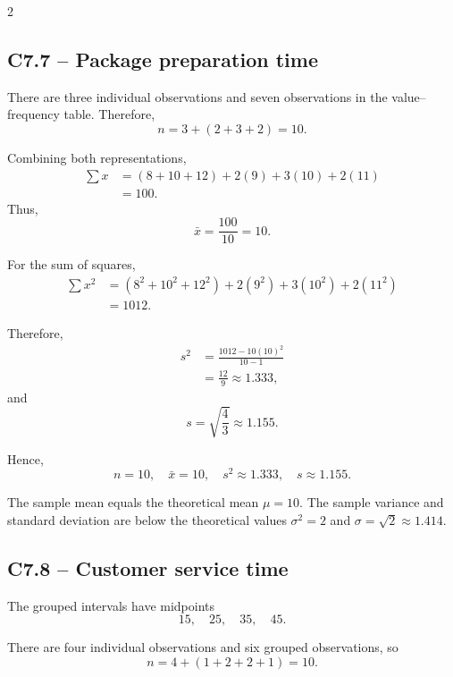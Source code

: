 \begin{multicols}{2}
		\subsection*{C7.7 -- Package preparation time}
		\label{subsec:c7-solution-package-preparation}
		
		There are three individual observations and seven observations in the
		value--frequency table. Therefore,
		\[
		n=3+(2+3+2)=10.
		\]
		
		Combining both representations,
		\[
		\begin{aligned}
			\sum x
			&=(8+10+12)+2(9)+3(10)+2(11)\\
			&=100.
		\end{aligned}
		\]
		Thus,
		\[
		\bar{x}=\frac{100}{10}=10.
		\]
		
		For the sum of squares,
		\[
		\begin{aligned}
			\sum x^2
			&=(8^2+10^2+12^2)
			+2(9^2)+3(10^2)+2(11^2)\\
			&=1012.
		\end{aligned}
		\]
		
		Therefore,
		\[
		\begin{aligned}
			s^2
			&=\frac{1012-10(10)^2}{10-1}\\
			&=\frac{12}{9}
			\approx1.333,
		\end{aligned}
		\]
		and
		\[
		s=\sqrt{\frac43}\approx1.155.
		\]
		
		Hence,
		\[
		\boxed{
			n=10,\quad
			\bar{x}=10,\quad
			s^2\approx1.333,\quad
			s\approx1.155.
		}
		\]
		
		The sample mean equals the theoretical mean $\mu=10$. The sample variance
		and standard deviation are below the theoretical values
		$\sigma^2=2$ and $\sigma=\sqrt2\approx1.414$.
		
		
		\subsection*{C7.8 -- Customer service time}
		\label{subsec:c7-solution-customer-service}
		
		The grouped intervals have midpoints
		\[
		15,\quad25,\quad35,\quad45.
		\]
		
		There are four individual observations and six grouped observations, so
		\[
		n=4+(1+2+2+1)=10.
		\]
		

\end{multicols}
